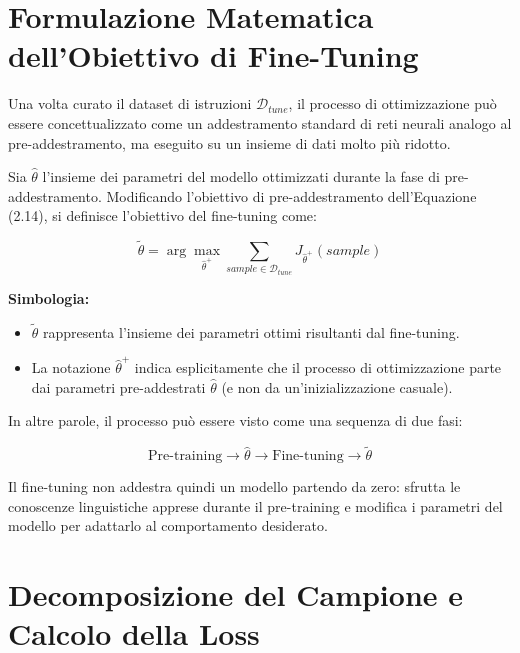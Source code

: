 \section*{Formulazione Matematica dell'Obiettivo di Fine-Tuning}

Una volta curato il dataset di istruzioni $\mathcal{D}_{tune}$, il processo di ottimizzazione può essere concettualizzato come un addestramento standard di reti neurali analogo al pre-addestramento, ma eseguito su un insieme di dati molto più ridotto.

Sia $\hat{\theta}$ l'insieme dei parametri del modello ottimizzati durante la fase di pre-addestramento. Modificando l'obiettivo di pre-addestramento dell'Equazione (2.14), si definisce l'obiettivo del fine-tuning come:

\begin{equation}
\tilde{\theta}
=
\arg\max_{\hat{\theta}^+}
\sum_{sample \in \mathcal{D}_{tune}}
J_{\hat{\theta}^+}(sample)
\tag{2.16}
\end{equation}

\textbf{Simbologia:}

\begin{itemize}

    \item $\tilde{\theta}$ rappresenta l'insieme dei parametri ottimi risultanti dal fine-tuning.

    \item La notazione $\hat{\theta}^+$ indica esplicitamente che il processo di ottimizzazione parte dai parametri pre-addestrati $\hat{\theta}$ (e non da un'inizializzazione casuale).

\end{itemize}

In altre parole, il processo può essere visto come una sequenza di due fasi:

\begin{equation}
\boxed{
\text{Pre-training}
\longrightarrow
\hat{\theta}
\longrightarrow
\text{Fine-tuning}
\longrightarrow
\tilde{\theta}
}
\end{equation}

Il fine-tuning non addestra quindi un modello partendo da zero: sfrutta le conoscenze linguistiche apprese durante il pre-training e modifica i parametri del modello per adattarlo al comportamento desiderato.

\section*{Decomposizione del Campione e Calcolo della Loss}

